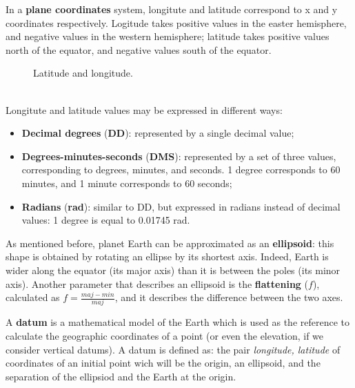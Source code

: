 In a \textbf{plane coordinates} system, longitute and latitude correspond to x and y coordinates respectively. Logitude takes positive values in the easter hemisphere, and negative values in the western hemisphere; latitude takes positive values north of the equator, and negative values south of the equator.
\begin{figure}[!ht]
    \centering
    
    \caption{Latitude and longitude.}
    \label{fig:lat-lon-earth}
\end{figure}
\\
Longitute and latitude values may be expressed in different ways:
\begin{itemize}
    \item \textbf{Decimal degrees} (\textbf{DD}): represented by a single decimal value;
    \item \textbf{Degrees-minutes-seconds} (\textbf{DMS}): represented by a set of three values, corresponding to degrees, minutes, and seconds. 1 degree corresponds to 60 minutes, and 1 minute corresponds to 60 seconds;
    \item \textbf{Radians} (\textbf{rad}): similar to DD, but expressed in radians instead of decimal values: 1 degree is equal to 0.01745 rad.
\end{itemize}

As mentioned before, planet Earth can be approximated as an \textbf{ellipsoid}: this shape is obtained by rotating an ellipse by its shortest axis. Indeed, Earth is wider along the equator (its major axis) than it is between the poles (its minor axis). Another parameter that describes an ellipsoid is the \textbf{flattening} ($f$), calculated as $f = \frac{maj - min}{maj}$, and it describes the difference between the two axes.

A \textbf{datum} is a mathematical model of the Earth which is used as the reference to calculate the geographic coordinates of a point (or even the elevation, if we consider vertical datums). A datum is defined as: the pair \textit{longitude, latitude} of coordinates of an initial point wich will be the origin, an ellipsoid, and the separation of the ellipsiod and the Earth at the origin.


